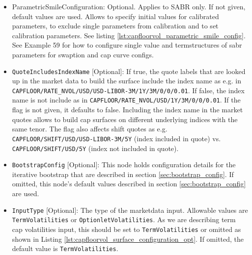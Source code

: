 \begin{itemize}
\item ParametricSmileConfiguration: Optional. Applies to SABR only. If not given, default values are used. Allows to specify initial values
  for calibrated parameters, to exclude single parameters from calibration and to set calibration parameters. See
  listing \ref{lst:capfloorvol_parametric_smile_config}. See Example 59 for how to configure single value and
  termstructures of sabr parameters for swaption and cap curve configs.

\item \lstinline!QuoteIncludesIndexName! [Optional]:
If true, the quote labels that are looked up in the market data to build the surface include the index name as e.g. in \lstinline!CAPFLOOR/RATE_NVOL/USD/USD-LIBOR-3M/1Y/3M/0/0/0.01!. If false, the index name is not include as in \lstinline!CAPFLOOR/RATE_NVOL/USD/1Y/3M/0/0/0.01!. If the flag is not given, it defaults to false. Including the index name in the market quotes allows to build cap surfaces on different underlying indices with the same tenor. The flag also affects shift quotes as e.g. \lstinline!CAPFLOOR/SHIFT/USD/USD-LIBOR-3M/5Y! (index included in quote) vs. \lstinline!CAPFLOOR/SHIFT/USD/5Y! (index not included in quote).

\item \lstinline!BootstrapConfig! [Optional]:
This node holds configuration details for the iterative bootstrap that are described in section \ref{sec:bootstrap_config}. If omitted, this node's default values described in section \ref{sec:bootstrap_config} are used.

\item \lstinline!InputType! [Optional]:
The type of the marketdata input. Allowable values are \lstinline!TermVolatilities! or \lstinline!OptionletVolatilities!. As we are describing term cap volatilities input, this should be set to \lstinline!TermVolatilities! or omitted as shown in Listing \ref{lst:capfloorvol_surface_configuration_opt}. If omitted, the default value is \lstinline!TermVolatilities!.

\end{itemize}


